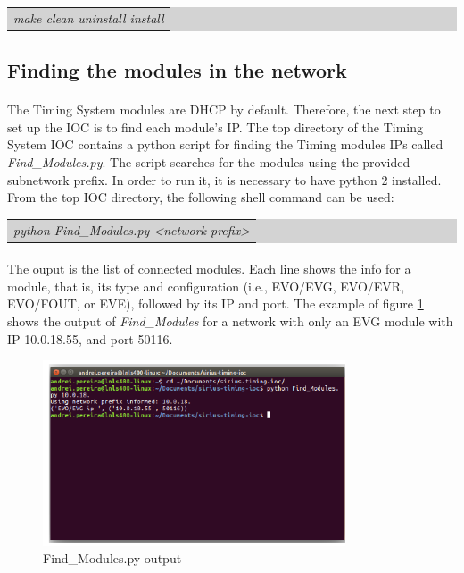 \documentclass[openany]{article}
\begin{document}
		\bigskip
		\colorbox{lightgray}{
			\begin{tabularx}{0.9\textwidth}{X}
			\emph{make clean uninstall install}
			\end{tabularx}
		}

	\subsection{Finding the modules in the network}

		\paragraph{} The Timing System modules are DHCP by default. Therefore, the next step to set up the IOC is to find each module's IP. The top directory of the Timing System IOC contains a python script for finding the Timing modules IPs called \emph{Find\_Modules.py}. The script searches for the modules using the provided subnetwork prefix.
		In order to run it, it is necessary to have python 2 installed. From the top IOC directory, the following shell command  can be used:
		
		\bigskip
		\colorbox{lightgray}{
			\begin{tabularx}{0.9\textwidth}{X}
			\emph{python Find\_Modules.py \textless network prefix\textgreater}
			\end{tabularx}
		}

		\paragraph{} The ouput is the list of connected modules. Each line shows the info for a module, that is, its type and configuration (i.e., EVO/EVG, EVO/EVR, EVO/FOUT, or EVE), followed by its IP and port. The example of figure \ref{fig:find-modules} shows the output of \emph{Find\_Modules} for a network with only an EVG module with IP 10.0.18.55, and port 50116. 

		\begin{figure}[!h]
		\caption{Find\_Modules.py output}
		\label{fig:find-modules}
		\centering
		\includegraphics[width=0.8\textwidth]{find-modules-image}
		\end{figure}
\FloatBarrier
\end{document}
